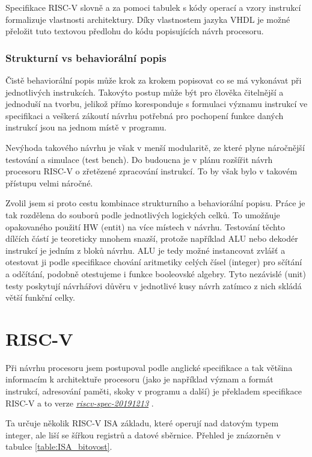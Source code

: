 \documentclass[FM,BP]{tulthesis}
\begin{document}
Specifikace RISC-V slovně a za pomoci tabulek s kódy operací a vzory instrukcí formalizuje vlastnosti architektury. Díky vlastnostem jazyka VHDL je možné přeložit tuto textovou předlohu do kódu popisujících návrh procesoru. 

\subsection{Strukturní vs behaviorální popis}
Čistě behaviorální popis může krok za krokem popisovat co se má vykonávat při jednotlivých instrukcích. Takovýto postup může být pro člověka čitelnější a jednoduší na tvorbu, jelikož přímo koresponduje s formulaci významu instrukcí ve specifikaci a veškerá zákoutí návrhu potřebná pro pochopení funkce daných instrukcí jsou na jednom místě v programu. 

Nevýhoda takového návrhu je však v menší modularitě, ze které plyne náročnější testování a simulace (test bench). Do budoucna je v plánu rozšířit návrh procesoru RISC-V o zřetězené zpracování instrukcí. To by však bylo v takovém přístupu velmi náročné.  

Zvolil jsem si proto cestu kombinace strukturního a behaviorální popisu. Práce je tak rozdělena do souborů podle jednotlivých logických celků. To umožňuje opakovaného použití HW (entit) na více místech v návrhu. Testování těchto dílčích částí je teoreticky mnohem snazší, protože například ALU nebo dekodér instrukcí je jedním z bloků návrhu. ALU je tedy možné instancovat zvlášť a otestovat ji podle specifikace chování aritmetiky celých čísel (integer) pro sčítání a odčítání, podobně otestujeme i funkce booleovské algebry. Tyto nezávislé (unit) testy poskytují návrhářovi důvěru v jednotlivé kusy návrh zatímco z nich skládá větší funkční celky. 

\chapter{RISC-V} \label{kap:RISC-V}
Při návrhu procesoru jsem postupoval podle anglické specifikace a tak většina informacím k architektuře procesoru (jako je například význam a formát instrukcí, adresování paměti, skoky v programu a další) je překladem specifikace RISC-V a to verze \href{https://riscv.org/wp-content/uploads/2019/12/riscv-spec-20191213.pdf}{\emph{riscv-spec-20191213}} \cite{RISC-V}.

Ta určuje několik RISC-V ISA základu, které operují nad datovým typem integer,  ale liší se šířkou registrů a datové sběrnice. Přehled je znázorněn v tabulce \ref{table:ISA_bitovost}.
\end{document}
